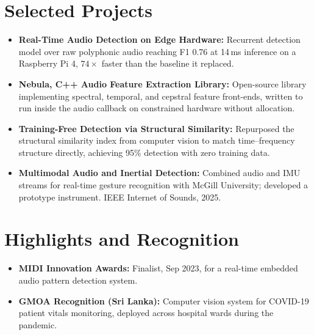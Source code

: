 \documentclass[11pt]{article}
\begin{document}
\section*{Selected Projects}
\begin{itemize}[leftmargin=1.2em, itemsep=-0.25em]
    \item \textbf{Real-Time Audio Detection on Edge Hardware:} Recurrent detection model over raw polyphonic audio reaching F1 0.76 at 14\,ms inference on a Raspberry Pi 4, $74\times$ faster than the baseline it replaced.
    \item \textbf{Nebula, C++ Audio Feature Extraction Library:} Open-source library implementing spectral, temporal, and cepstral feature front-ends, written to run inside the audio callback on constrained hardware without allocation.
    \item \textbf{Training-Free Detection via Structural Similarity:} Repurposed the structural similarity index from computer vision to match time--frequency structure directly, achieving 95\% detection with zero training data.
    \item \textbf{Multimodal Audio and Inertial Detection:} Combined audio and IMU streams for real-time gesture recognition with McGill University; developed a prototype instrument. IEEE Internet of Sounds, 2025.
\end{itemize}

\vspace{-1em}
\section*{Highlights and Recognition}
\begin{itemize}[leftmargin=1.2em, itemsep=-0.25em]
    \item \textbf{MIDI Innovation Awards:} Finalist, Sep 2023, for a real-time embedded audio pattern detection system.
    \item \textbf{GMOA Recognition (Sri Lanka):} Computer vision system for COVID-19 patient vitals monitoring, deployed across hospital wards during the pandemic.
\end{itemize}
\end{document}
